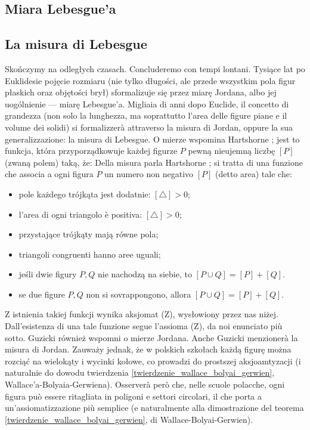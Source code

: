\subsection{Miara Lebesgue'a} %
\subsection{La misura di Lebesgue} %

Skończymy na odległych czasach. %
Concluderemo con tempi lontani. %
Tysiące lat po Euklidesie pojęcie rozmiaru (nie tylko długości, ale przede wszystkim pola figur płaskich oraz objętości brył) sformalizuje się przez miarę Jordana, albo jej uogólnienie --- miarę Lebesgue'a. %
Migliaia di anni dopo Euclide, il concetto di grandezza (non solo la lunghezza, ma soprattutto l'area delle figure piane e il volume dei solidi) si formalizzerà attraverso la misura di Jordan, oppure la sua generalizzazione: la misura di Lebesgue. %
O mierze wspomina Hartshorne \cite[s. 205]{hartshorne_2000}; jest to funkcja, która przyporządkowuje każdej figurze $P$ pewną nieujemną liczbę $[P]$ (zwaną polem) taką, że: %
Della misura parla Hartshorne \cite[p. 205]{hartshorne_2000}; si tratta di una funzione che associa a ogni figura $P$ un numero non negativo $[P]$ (detto area) tale che: %
\begin{itemize}
    \item pole każdego trójkąta jest dodatnie: $[\triangle] > 0$; %
    \item l'area di ogni triangolo è positiva: $[\triangle] > 0$; %
    \item przystające trójkąty mają równe pola; %
    \item triangoli congruenti hanno aree uguali; %
    \item jeśli dwie figury $P, Q$ nie nachodzą na siebie, to $[P \cup Q] = [P] + [Q]$. %
    \item se due figure $P, Q$ non si sovrappongono, allora $[P \cup Q] = [P] + [Q]$. %
\end{itemize}

Z istnienia takiej funkcji wynika aksjomat (Z), wysłowiony przez nas niżej. %
Dall'esistenza di una tale funzione segue l'assioma (Z), da noi enunciato più sotto. %
Guzicki \cite[s. 38-68]{guzicki_2021} również wspomni o mierze Jordana. %
Anche Guzicki \cite[p. 38-68]{guzicki_2021} menzionerà la misura di Jordan. %
Zauważy jednak, że w polskich szkołach każdą figurę można rozciąć na wielokąty i wycinki kołowe, co prowadzi do prostszej aksjoamtyzacji (i naturalnie do dowodu twierdzenia \ref{twierdzenie_wallace_bolyai_gerwien}, Wallace'a-Bolyaia-Gerwiena). %
Osserverà però che, nelle scuole polacche, ogni figura può essere ritagliata in poligoni e settori circolari, il che porta a un'assiomatizzazione più semplice (e naturalmente alla dimostrazione del teorema \ref{twierdzenie_wallace_bolyai_gerwien}, di Wallace-Bolyai-Gerwien). %

